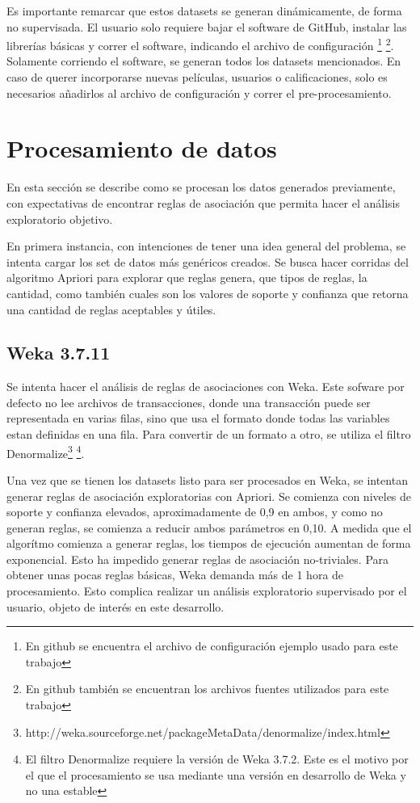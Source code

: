 \documentclass[journal]{IEEEtran}
\begin{document}
Es importante remarcar que estos datasets se generan dinámicamente, de forma 
no supervisada. El usuario solo requiere bajar el software de GitHub, instalar
las librerías básicas y correr el software, indicando el archivo de configuración
\footnote{En github se encuentra el archivo de configuración ejemplo usado para este trabajo}
\footnote{En github también se encuentran los archivos fuentes utilizados para este trabajo}. 
Solamente corriendo el software, se generan todos los datasets mencionados.  En caso de
querer incorporarse nuevas películas, usuarios o calificaciones, solo es necesarios
añadirlos al archivo de configuración y correr el pre-procesamiento.





\section{Procesamiento de datos}
En esta sección se describe como se procesan los datos generados previamente, 
con expectativas de encontrar reglas de asociación que permita hacer el
análisis exploratorio objetivo.

En primera instancia, con intenciones de tener una idea general del problema,
se intenta cargar los set de datos más genéricos creados. Se busca hacer 
corridas del algoritmo Apriori para explorar
que reglas genera, que tipos de reglas, la cantidad, como
también cuales son los valores de soporte y confianza que retorna una cantidad
de reglas aceptables y útiles. 

\subsection{Weka 3.7.11}
Se intenta hacer el análisis de reglas de asociaciones con Weka. Este sofware por defecto
no lee archivos de transacciones, donde una transacción puede ser representada en varias filas,
 sino que usa el formato donde todas las variables estan definidas en una fila. Para convertir
de un formato a otro, se utiliza el filtro 
Denormalize\footnote{http://weka.sourceforge.net/packageMetaData/denormalize/index.html}
\footnote{El filtro Denormalize requiere la versión de Weka 3.7.2. Este es el motivo por el que 
el procesamiento se usa mediante una versión en desarrollo de Weka y no una estable}. 

Una vez que se tienen los datasets listo para ser procesados en Weka, se intentan generar reglas
de asociación exploratorias con Apriori. Se comienza con niveles de soporte y confianza elevados,
aproximadamente de 0,9 en ambos, y como no generan reglas, se comienza a reducir ambos parámetros
en 0,10. A medida que el algorítmo comienza a generar reglas, los tiempos de ejecución aumentan
de forma exponencial. Esto ha impedido generar reglas de asociación no-triviales. Para obtener
unas pocas reglas básicas, Weka demanda más de 1 hora de procesamiento. Esto complica realizar un análisis
exploratorio supervisado por el usuario, objeto de interés en este desarrollo.
\end{document}
